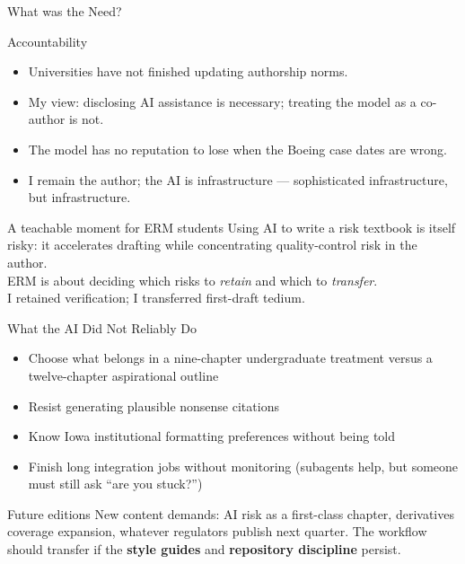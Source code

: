 \documentclass[11pt, aspectratio=169]{beamer}
\begin{document}
\begin{frame}{What was the Need?}
\begin{frame}{Accountability}
\begin{itemize}
  \item Universities have not finished updating authorship norms.
  \item My view: \alert{disclosing AI assistance is necessary};
        treating the model as a co-author is not.
  \item The model has no reputation to lose when the Boeing case dates are wrong.
  \item I remain the author; the AI is infrastructure ---
        sophisticated infrastructure, but infrastructure.
\end{itemize}
\medskip
\begin{block}{A teachable moment for ERM students}
Using AI to write a risk textbook is itself risky: it accelerates drafting
while concentrating quality-control risk in the author.\\
ERM is about deciding which risks to \emph{retain} and which to \emph{transfer}.\\
I retained verification; I transferred first-draft tedium.
\end{block}
\end{frame}

\begin{frame}{What the AI Did Not Reliably Do}
\begin{itemize}
  \item Choose what belongs in a nine-chapter undergraduate treatment versus
        a twelve-chapter aspirational outline
  \item Resist generating plausible nonsense citations
  \item Know Iowa institutional formatting preferences without being told
  \item Finish long integration jobs without monitoring
        (subagents help, but someone must still ask ``are you stuck?'')
\end{itemize}
\medskip
\begin{block}{Future editions}
New content demands: AI risk as a first-class chapter, derivatives coverage expansion,
whatever regulators publish next quarter.
The workflow should transfer if the \textbf{style guides} and
\textbf{repository discipline} persist.
\end{block}
\end{frame}


\end{frame}
\end{document}
